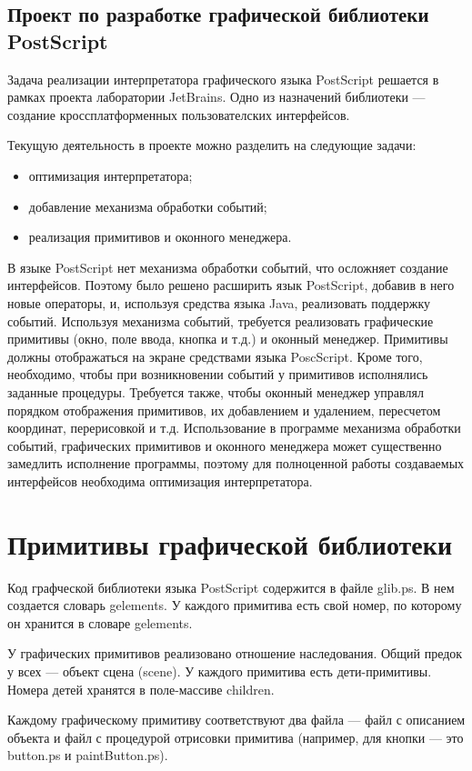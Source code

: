 \documentclass[14pt]{extarticle}
\begin{document}
	\subsection{ Проект по разработке графической библиотеки PostScript }
Задача реализации интерпретатора графического языка PostScript решается в рамках проекта лаборатории JetBrains. Одно из назначений библиотеки --- создание кроссплатформенных пользователских интерфейсов.
		
		Текущую деятельность в проекте можно разделить на следующие задачи:
		\begin{itemize}
		\item оптимизация интерпретатора;
		\item добавление механизма обработки событий;
		\item реализация примитивов и оконного менеджера.
		\end{itemize}	
	
	В языке PostScript нет механизма обработки событий, что осложняет создание интерфейсов. Поэтому было решено расширить язык PostScript, добавив в него новые операторы, и, используя средства языка Java, реализовать поддержку событий. Используя механизма событий, требуется реализовать графические примитивы (окно, поле ввода, кнопка и т.д.) и оконный менеджер. Примитивы должны отображаться на экране средствами языка PoscScript. Кроме того, необходимо, чтобы при возникновении событий у примитивов исполнялись заданные процедуры. Требуется также, чтобы оконный менеджер управлял порядком отображения примитивов, их добавлением и удалением, пересчетом координат, перерисовкой и т.д. Использование в программе механизма обработки событий, графических примитивов и оконного менеджера может существенно замедлить исполнение программы, поэтому для полноценной работы создаваемых интерфейсов необходима оптимизация интерпретатора.
	\pagebreak
	\section{Примитивы графической библиотеки}
		Код графческой библиотеки языка PostScript содержится в файле  glib.ps. В нем создается словарь gelements. У каждого примитива есть свой номер, по которому он хранится в словаре gelements. 
		
		У графических примитивов реализовано отношение наследования. Общий предок у всех --- объект сцена (scene). У каждого примитива есть дети-примитивы. Номера детей хранятся в поле-массиве children.
		
		Каждому графическому примитиву соответствуют два файла --- файл с описанием объекта и файл с процедурой отрисовки примитива (например, для кнопки --- это button.ps и paintButton.ps). 
		
\end{document}
